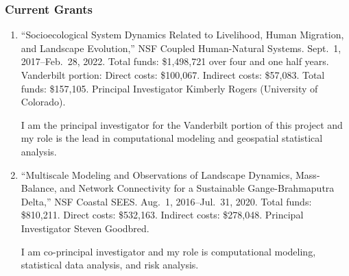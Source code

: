 %
%
\subsubsection{Current Grants}
\begin{enumerate}
    \item ``Socioecological System Dynamics Related to Livelihood, Human Migration, and Landscape Evolution,'' NSF Coupled Human-Natural Systems. Sept.~1, 2017--Feb.~28, 2022. Total funds: \$1,498,721 over four and one half years. Vanderbilt portion: Direct costs: \$100,067. Indirect costs: \$57,083. Total funds: \$157,105. Principal Investigator Kimberly Rogers (University of Colorado). 
    \begin{credit}
    	I am the principal investigator for the Vanderbilt portion of this project and my role is the lead in computational modeling and geospatial statistical analysis.
    \end{credit}
	\item ``Multiscale Modeling and Observations of Landscape Dynamics, Mass-Balance, and Network Connectivity for a Sustainable Gange-Brahmaputra Delta,'' NSF Coastal SEES. Aug.~1, 2016--Jul.~31, 2020. Total funds: \$810,211. Direct costs: \$532,163. Indirect costs: \$278,048. Principal Investigator Steven Goodbred. 
	\begin{credit}		
		I am co-principal investigator and my role is computational modeling, statistical data analysis, and risk analysis.
	\end{credit}
\end{enumerate}
%
\iffalse
\subsubsection{Pending Grant Proposals}
\begin{enumerate}
\end{enumerate}
\fi 
%
